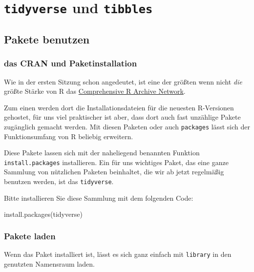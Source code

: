 \documentclass[
]{book}
\newenvironment{Shaded}{\begin{snugshade}}{\end{snugshade}}
\newcommand{\FunctionTok}[1]{\textcolor[rgb]{0.00,0.00,0.00}{#1}}
\newcommand{\NormalTok}[1]{#1}
\newcommand{\StringTok}[1]{\textcolor[rgb]{0.31,0.60,0.02}{#1}}
\begin{document}
\hypertarget{tidyverse-und-tibbles}{%
\chapter{\texorpdfstring{\texttt{tidyverse} und \texttt{tibbles}}{tidyverse und tibbles}}\label{tidyverse-und-tibbles}}

\hypertarget{pakete-benutzen}{%
\section{Pakete benutzen}\label{pakete-benutzen}}

\hypertarget{das-cran-und-paketinstallation}{%
\subsection{das CRAN und Paketinstallation}\label{das-cran-und-paketinstallation}}

Wie in der ersten Sitzung schon angedeutet, ist eine der größten wenn nicht \emph{die} größte Stärke von R das \href{https://cran.r-project.org/}{Comprehensive R Archive Network}.

Zum einen werden dort die Installationsdateien für die neuesten R-Versionen gehostet, für uns viel praktischer ist aber, dass dort auch fast unzählige Pakete zugänglich gemacht werden. Mit diesen Paketen oder auch \texttt{packages} lässt sich der Funktionsumfang von R beliebig erweitern.

Diese Pakete lassen sich mit der naheliegend benannten Funktion \texttt{install.packages} installieren. Ein für uns wichtiges Paket, das eine ganze Sammlung von nützlichen Paketen beinhaltet, die wir ab jetzt regelmäßig benutzen werden, ist das \texttt{tidyverse}.

Bitte installieren Sie diese Sammlung mit dem folgenden Code:

\begin{Shaded}
\begin{Highlighting}[]
\FunctionTok{install.packages}\NormalTok{(}\StringTok{\textquotesingle{}tidyverse\textquotesingle{}}\NormalTok{)}
\end{Highlighting}
\end{Shaded}

\hypertarget{pakete-laden}{%
\subsection{Pakete laden}\label{pakete-laden}}

Wenn das Paket installiert ist, lässt es sich ganz einfach mit \texttt{library} in den genutzten Namensraum laden.
\end{document}
